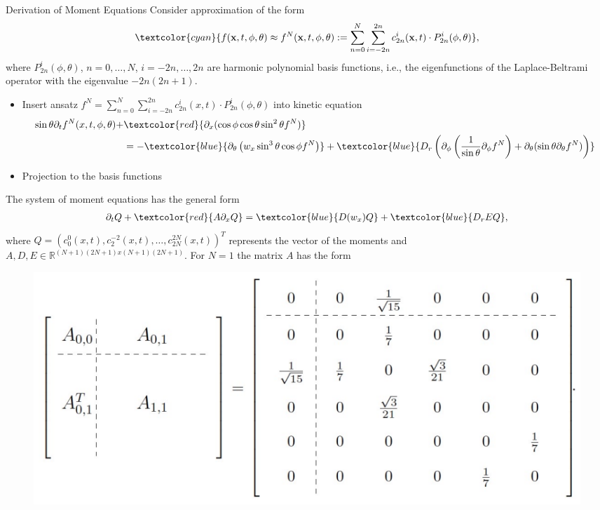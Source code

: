 \begin{frame}{Derivation of Moment Equations}
	\scriptsize
	Consider approximation of the form
	\begin{align}
		\textcolor{cyan}{f(\textbf{x}, t, \phi, \theta) \approx f^N(\textbf{x},t,\phi,\theta) :=  \sum_{n=0}^{N} \sum_{i=-2n}^{2n} c^i_{2n}(\textbf{x},t) \cdot P^i_{2n}(\phi, \theta)}, \label{spectralmethod}
	\end{align}
	where $P^i_{2n}(\phi, \theta)$, $n = 0, \ldots, N$, $i = -2n, \ldots, 2n$
 are harmonic polynomial basis functions, i.e., the eigenfunctions of the Laplace-Beltrami operator with the eigenvalue $-2n(2n+1)$. 
 \pause
 	\begin{itemize}
 	\item Insert ansatz $f^N =  \sum_{n=0}^{N} \sum_{i=-2n}^{2n} c^i_{2n}(x,t) \cdot P^i_{2n}(\phi, \theta)$ into kinetic equation
 	\begin{align*}
 		\sin\theta \partial_{t}f^N(x,t,\phi,\theta) + &  \textcolor{red}{\partial_x (\cos\phi \cos\theta \sin^2\theta f^N)} \\
 		& 
 		=- \textcolor{blue}{\partial_\theta \left(w_x \sin^3 \theta \cos \phi f^N\right)} +\textcolor{blue}{D_{r} \left( \partial_\phi \left(\frac{1}{\sin \theta} \partial_\phi f^N \right) + \partial_\theta (\sin \theta \partial_\theta f^N) \right)}
 	\end{align*}
 	\item Projection to the basis functions
 \end{itemize}
\end{frame}



\begin{frame}
	\scriptsize
	The system of moment equations has the general form
	\begin{align}
		\partial_t Q + \textcolor{red}{A\partial_x Q} = \textcolor{blue}{D(w_x)Q}+ \textcolor{blue}{D_rE Q},
	\end{align}
	where $Q=(c^0_0(x,t), c^{-2}_2(x,t), \ldots, c^{2N}_{2N}(x,t))^T$ represents the vector of the moments and \\
	\vspace{2mm}
	$A,D,E \in \mathbb{R}^{(N+1)(2N+1)x(N+1)(2N+1)}$.
	For $N=1$ the matrix $A$ has the form
	\begin{figure}[H]
		\includegraphics[scale=0.5]{Bilder/MatrixA}
	\end{figure}
\end{frame}



